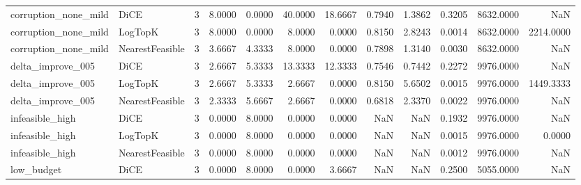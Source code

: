 \begin{tabular}{llrrrrrrrrrr}
corruption\_none\_mild &            DiCE &      3 &            8.0000 &          0.0000 &         40.0000 &       18.6667 &             0.7940 &         1.3862 &       0.3205 &          8632.0000 &                   NaN \\
corruption\_none\_mild &         LogTopK &      3 &            8.0000 &          0.0000 &          8.0000 &        0.0000 &             0.8150 &         2.8243 &       0.0014 &          8632.0000 &             2214.0000 \\
corruption\_none\_mild & NearestFeasible &      3 &            3.6667 &          4.3333 &          8.0000 &        0.0000 &             0.7898 &         1.3140 &       0.0030 &          8632.0000 &                   NaN \\
   delta\_improve\_005 &            DiCE &      3 &            2.6667 &          5.3333 &         13.3333 &       12.3333 &             0.7546 &         0.7442 &       0.2272 &          9976.0000 &                   NaN \\
   delta\_improve\_005 &         LogTopK &      3 &            2.6667 &          5.3333 &          2.6667 &        0.0000 &             0.8150 &         5.6502 &       0.0015 &          9976.0000 &             1449.3333 \\
   delta\_improve\_005 & NearestFeasible &      3 &            2.3333 &          5.6667 &          2.6667 &        0.0000 &             0.6818 &         2.3370 &       0.0022 &          9976.0000 &                   NaN \\
     infeasible\_high &            DiCE &      3 &            0.0000 &          8.0000 &          0.0000 &        0.0000 &                NaN &            NaN &       0.1932 &          9976.0000 &                   NaN \\
     infeasible\_high &         LogTopK &      3 &            0.0000 &          8.0000 &          0.0000 &        0.0000 &                NaN &            NaN &       0.0015 &          9976.0000 &                0.0000 \\
     infeasible\_high & NearestFeasible &      3 &            0.0000 &          8.0000 &          0.0000 &        0.0000 &                NaN &            NaN &       0.0012 &          9976.0000 &                   NaN \\
          low\_budget &            DiCE &      3 &            0.0000 &          8.0000 &          0.0000 &        3.6667 &                NaN &            NaN &       0.2500 &          5055.0000 &                   NaN \\

\end{tabular}
